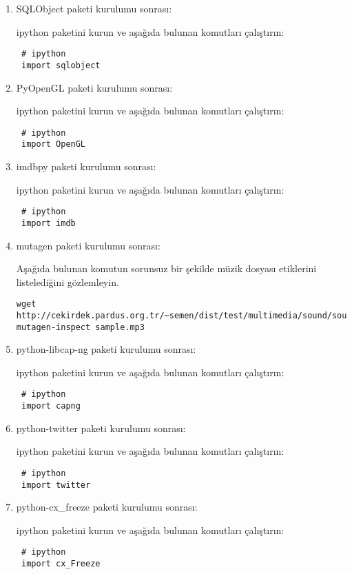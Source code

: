 \documentclass[a4paper,10pt]{article}
\begin{document}
\begin{enumerate}
\item SQLObject  paketi kurulumu sonrası:

ipython paketini kurun ve aşağıda bulunan komutları çalıştırın:
\begin{verbatim}
 # ipython
 import sqlobject
\end{verbatim}

\item PyOpenGL  paketi kurulumu sonrası:

ipython paketini kurun ve aşağıda bulunan komutları çalıştırın:
\begin{verbatim}
 # ipython
 import OpenGL
\end{verbatim}

\item imdbpy  paketi kurulumu sonrası:

ipython paketini kurun ve aşağıda bulunan komutları çalıştırın:
\begin{verbatim}
 # ipython
 import imdb
\end{verbatim}

\item mutagen  paketi kurulumu sonrası:

Aşağıda bulunan komutun sorunsuz bir şekilde müzik dosyası etiklerini listelediğini gözlemleyin.
\begin{verbatim}
wget http://cekirdek.pardus.org.tr/~semen/dist/test/multimedia/sound/sound/sample.mp3 
mutagen-inspect sample.mp3
\end{verbatim}


\item python-libcap-ng  paketi kurulumu sonrası:

ipython paketini kurun ve aşağıda bulunan komutları çalıştırın:
\begin{verbatim}
 # ipython
 import capng
\end{verbatim}

\item python-twitter paketi kurulumu sonrası:

ipython paketini kurun ve aşağıda bulunan komutları çalıştırın:
\begin{verbatim}
 # ipython
 import twitter
\end{verbatim}


\item python-cx\_freeze paketi kurulumu sonrası:

ipython paketini kurun ve aşağıda bulunan komutları çalıştırın:
\begin{verbatim}
 # ipython
 import cx_Freeze
\end{verbatim}


\end{enumerate}
\end{document}
